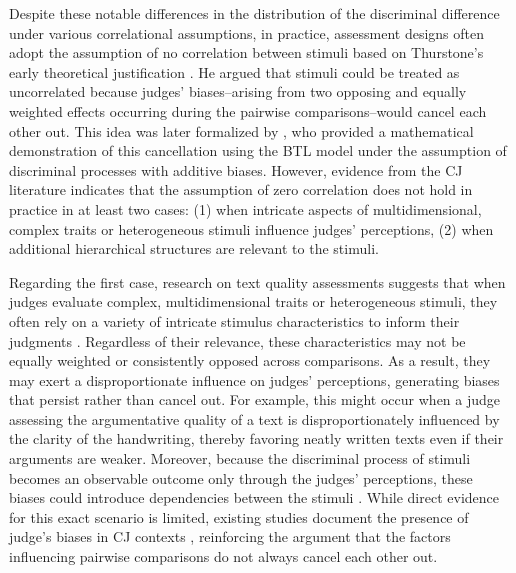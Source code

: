 \documentclass[
  authoryear,
  review,
  1p]{elsarticle}
\begin{document}
Despite these notable differences in the distribution of the discriminal
difference under various correlational assumptions, in practice,
assessment designs often adopt the assumption of no correlation between
stimuli based on Thurstone's early theoretical justification
\citep{Thurstone_1927b}. He argued that stimuli could be treated as
uncorrelated because judges' biases--arising from two opposing and
equally weighted effects occurring during the pairwise
comparisons--would cancel each other out. This idea was later formalized
by \citet{Andrich_1978}, who provided a mathematical demonstration of
this cancellation using the BTL model under the assumption of
discriminal processes with additive biases. However, evidence from the
CJ literature indicates that the assumption of zero correlation does not
hold in practice in at least two cases: (1) when intricate aspects of
multidimensional, complex traits or heterogeneous stimuli influence
judges' perceptions, (2) when additional hierarchical structures are
relevant to the stimuli.

Regarding the first case, research on text quality assessments suggests
that when judges evaluate complex, multidimensional traits or
heterogeneous stimuli, they often rely on a variety of intricate
stimulus characteristics to inform their judgments
\citep{vanDaal_et_al_2016, Lesterhuis_et_al_2018, Chambers_et_al_2022}.
Regardless of their relevance, these characteristics may not be equally
weighted or consistently opposed across comparisons. As a result, they
may exert a disproportionate influence on judges' perceptions,
generating biases that persist rather than cancel out. For example, this
might occur when a judge assessing the argumentative quality of a text
is disproportionately influenced by the clarity of the handwriting,
thereby favoring neatly written texts even if their arguments are
weaker. Moreover, because the discriminal process of stimuli becomes an
observable outcome only through the judges' perceptions, these biases
could introduce dependencies between the stimuli
\citep{vanderLinden_et_al_2017_II}. While direct evidence for this exact
scenario is limited, existing studies document the presence of judge's
biases in CJ contexts
\citep{Pollitt_et_al_2003, vanDaal_et_al_2016, Bartholomew_et_al_2020a},
reinforcing the argument that the factors influencing pairwise
comparisons do not always cancel each other out.
\end{document}
